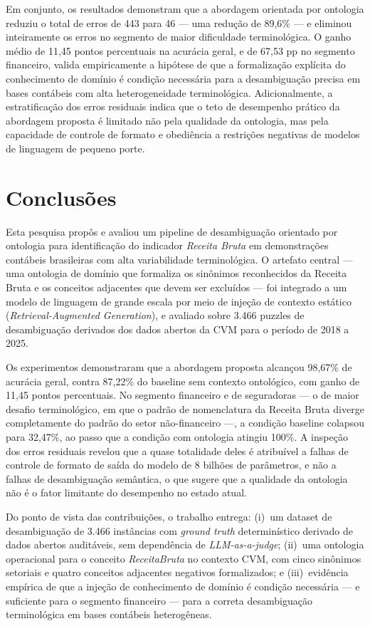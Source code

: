 \documentclass[12pt,a4paper]{article}
\begin{document}
Em conjunto, os resultados demonstram que a abordagem orientada por ontologia reduziu o total de erros de 443 para 46 --- uma redução de 89,6\% --- e eliminou inteiramente os erros no segmento de maior dificuldade terminológica. O ganho médio de 11,45 pontos percentuais na acurácia geral, e de 67,53 pp no segmento financeiro, valida empiricamente a hipótese de que a formalização explícita do conhecimento de domínio é condição necessária para a desambiguação precisa em bases contábeis com alta heterogeneidade terminológica. Adicionalmente, a estratificação dos erros residuais indica que o teto de desempenho prático da abordagem proposta é limitado não pela qualidade da ontologia, mas pela capacidade de controle de formato e obediência a restrições negativas de modelos de linguagem de pequeno porte.

\section{Conclusões}

Esta pesquisa propôs e avaliou um pipeline de desambiguação orientado por ontologia para identificação do indicador \textit{Receita Bruta} em demonstrações contábeis brasileiras com alta variabilidade terminológica. O artefato central --- uma ontologia de domínio que formaliza os sinônimos reconhecidos da Receita Bruta e os conceitos adjacentes que devem ser excluídos --- foi integrado a um modelo de linguagem de grande escala por meio de injeção de contexto estático (\textit{Retrieval-Augmented Generation}), e avaliado sobre 3.466 puzzles de desambiguação derivados dos dados abertos da CVM para o período de 2018 a 2025.

Os experimentos demonstraram que a abordagem proposta alcançou 98,67\% de acurácia geral, contra 87,22\% do baseline sem contexto ontológico, com ganho de 11,45 pontos percentuais. No segmento financeiro e de seguradoras --- o de maior desafio terminológico, em que o padrão de nomenclatura da Receita Bruta diverge completamente do padrão do setor não-financeiro ---, a condição baseline colapsou para 32,47\%, ao passo que a condição com ontologia atingiu 100\%. A inspeção dos erros residuais revelou que a quase totalidade deles é atribuível a falhas de controle de formato de saída do modelo de 8 bilhões de parâmetros, e não a falhas de desambiguação semântica, o que sugere que a qualidade da ontologia não é o fator limitante do desempenho no estado atual.

Do ponto de vista das contribuições, o trabalho entrega: (i)~um dataset de desambiguação de 3.466 instâncias com \textit{ground truth} determinístico derivado de dados abertos auditáveis, sem dependência de \textit{LLM-as-a-judge}; (ii)~uma ontologia operacional para o conceito \textit{ReceitaBruta} no contexto CVM, com cinco sinônimos setoriais e quatro conceitos adjacentes negativos formalizados; e (iii)~evidência empírica de que a injeção de conhecimento de domínio é condição necessária --- e suficiente para o segmento financeiro --- para a correta desambiguação terminológica em bases contábeis heterogêneas.
\end{document}
